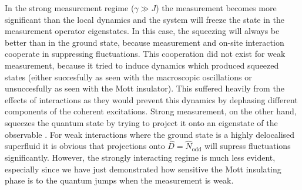 In the strong measurement regime ($\gamma \gg J$) the measurement
becomes more significant than the local dynamics and the system will
freeze the state in the measurement operator eigenstates. In this
case, the squeezing will always be better than in the ground state,
because measurement and on-site interaction cooperate in suppressing
fluctuations. This cooperation did not exist for weak measurement,
because it tried to induce dynamics which produced squeezed states
(either succesfully as seen with the macroscopic oscillations or
unsuccesfully as seen with the Mott insulator). This suffered heavily
from the effects of interactions as they would prevent this dynamics
by dephasing different components of the coherent excitations. Strong
measurement, on the other hand, squeezes the quantum state by trying
to project it onto an eigenstate of the observable
\cite{mekhov2009prl, mekhov2009prl}. For weak interactions where the
ground state is a highly delocalised superfluid it is obvious that
projections onto $\hat{D} = \hat{N}_\mathrm{odd}$ will supress
fluctuations significantly. However, the strongly interacting regime
is much less evident, especially since we have just demonstrated how
sensitive the Mott insulating phase is to the quantum jumps when the
measurement is weak.

